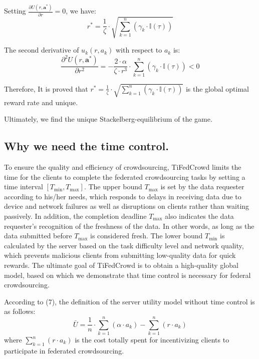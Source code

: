 \documentclass[final,1p,times]{elsarticle}
\begin{document}
Setting $\frac{\partial U(r,\bm{a}^\ast)}{\partial r} = 0$, we have:
\begin{equation}
	r^\ast =\frac{1}{\zeta}\cdot\sqrt{\sum_{k=1}^n(\gamma_k\cdot\mathbb{I}(\tau))}
\end{equation}	

The second derivative of $u_k(r,a_k)$ with respect to $a_k$ is:
\begin{equation}
	\frac{\partial^2 U(r,\bm{a}^\ast)}{\partial r^2} = - \frac{2\cdot\alpha}{\zeta\cdot r^3}\cdot\sum_{k=1}^n(\gamma_k\cdot\mathbb{I}(\tau)) < 0
\end{equation}	

Therefore, It is proved that $r^\ast = \frac{1}{\zeta}\cdot\sqrt{\sum_{k=1}^n(\gamma_k\cdot\mathbb{I}(\tau))}$ is the global optimal reward rate and unique. 

Ultimately, we find the unique Stackelberg-equilibrium of the game.
\subsection{Why we need the time control.}
To ensure the quality and efficiency of crowdsourcing, TiFedCrowd limits the time for the clients to complete the federated crowdsourcing tasks by setting a time interval $[T_{\min},T_{\max}]$. The upper bound $T_{\max}$ is set by the data requester according to his/her needs, which responds to delays in receiving data due to device and network failures as well as disruptions on clients rather than waiting passively. In addition, the completion deadline $T_{\max}$ also indicates the data requester's recognition of the freshness of the data. In other words, as long as the data submitted before $T_{\max}$ is considered fresh. The lower bound $T_{\min}$ is calculated by the server based on the task difficulty level and network quality, which prevents malicious clients from submitting low-quality data for quick rewards. The ultimate goal of TiFedCrowd is to obtain a high-quality global model, based on which we demonstrate that time control is necessary for federal crowdsourcing.

According to (7), the definition of the server utility model without time control is as follows: 
\begin{equation}
	\bar{U} = \frac{1}{n}\cdot \sum_{k=1}^n(\alpha\cdot a_k)  - \sum_{k=1}^n(r\cdot a_k)
\end{equation}
where $\sum_{k=1}^n(r\cdot a_k)$ is the cost totally spent for incentivizing clients to participate in federated crowdsourcing. 
\end{document}
